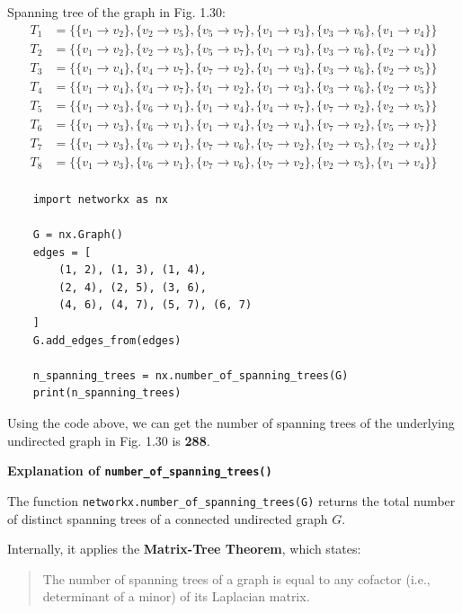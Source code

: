 \documentclass{article}
\begin{document}
Spanning tree of the graph in Fig. 1.30:
\begin{align*}
    T_1 &= \{ \{v_1 \to v_2\}, \{v_2 \to v_5\}, \{v_5 \to v_7\}, \{v_1 \to v_3\}, \{v_3 \to v_6\}, \{v_1 \to v_4\} \} \\
    T_2 &= \{ \{v_1 \to v_2\}, \{v_2 \to v_5\}, \{v_5 \to v_7\}, \{v_1 \to v_3\}, \{v_3 \to v_6\}, \{v_2 \to v_4\} \} \\
    T_3 &= \{ \{v_1 \to v_4\}, \{v_4 \to v_7\}, \{v_7 \to v_2\}, \{v_1 \to v_3\}, \{v_3 \to v_6\}, \{v_2 \to v_5\} \} \\
    T_4 &= \{ \{v_1 \to v_4\}, \{v_4 \to v_7\}, \{v_1 \to v_2\}, \{v_1 \to v_3\}, \{v_3 \to v_6\}, \{v_2 \to v_5\} \} \\
    T_5 &= \{ \{v_1 \to v_3\}, \{v_6 \to v_1\}, \{v_1 \to v_4\}, \{v_4 \to v_7\}, \{v_7 \to v_2\}, \{v_2 \to v_5\} \} \\
    T_6 &= \{ \{v_1 \to v_3\}, \{v_6 \to v_1\}, \{v_1 \to v_4\}, \{v_2 \to v_4\}, \{v_7 \to v_2\}, \{v_5 \to v_7\} \} \\
    T_7 &= \{ \{v_1 \to v_3\}, \{v_6 \to v_1\}, \{v_7 \to v_6\}, \{v_7 \to v_2\}, \{v_2 \to v_5\}, \{v_2 \to v_4\} \} \\
    T_8 &= \{ \{v_1 \to v_3\}, \{v_6 \to v_1\}, \{v_7 \to v_6\}, \{v_7 \to v_2\}, \{v_2 \to v_5\}, \{v_1 \to v_4\} \} \\
\end{align*}

\begin{verbatim}
    import networkx as nx
    
    G = nx.Graph()
    edges = [
        (1, 2), (1, 3), (1, 4),
        (2, 4), (2, 5), (3, 6),
        (4, 6), (4, 7), (5, 7), (6, 7)
    ]
    G.add_edges_from(edges)
    
    n_spanning_trees = nx.number_of_spanning_trees(G)
    print(n_spanning_trees)
\end{verbatim}

Using the code above, we can get the number of spanning trees of the underlying undirected graph in Fig. 1.30 is \textbf{288}.

\textbf{Explanation of \texttt{number\_of\_spanning\_trees()}}

The function \texttt{networkx.number\_of\_spanning\_trees(G)} returns the total number of distinct spanning trees of a connected undirected graph \( G \). 

Internally, it applies the \textbf{Matrix-Tree Theorem}, which states:

\begin{quote}
The number of spanning trees of a graph is equal to any cofactor (i.e., determinant of a minor) of its Laplacian matrix.
\end{quote}
\end{document}
